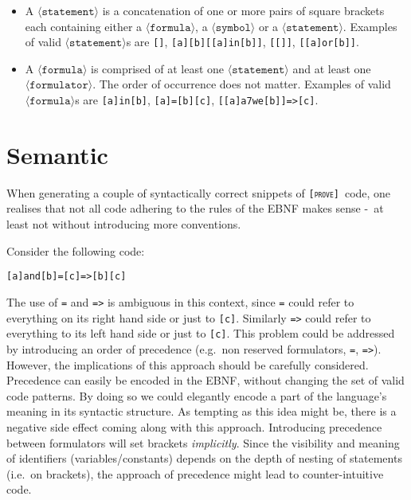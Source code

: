 \documentclass[british]{article}
\newcommand\prv{bc}
\newcommand\m[1]{\texttt{#1}}
\newcommand\name{\texttt{\textsc{[prove]}}}
\begin{document}
\begin{itemize}
		to choose them wisely. It could for example be confusing to name a
		formulator \m{7}, but \m{add7} makes intuitively sense.
	\item
		A $\langle\texttt{statement}\rangle$ is a concatenation of one or more
		pairs of square brackets each containing either a
		$\langle\texttt{formula}\rangle$, a $\langle\texttt{symbol}\rangle$ or a
		$\langle\texttt{statement}\rangle$.  Examples of valid
		$\langle\texttt{statement}\rangle$s are \m{[]}, \m{[a][b][[a]in[b]]},
		\m{[[]]}, \m{[[a]or[b]]}.  \item A $\langle\texttt{formula}\rangle$ is
		comprised of at least one $\langle\texttt{statement}\rangle$ and at
		least one $\langle\texttt{formulator}\rangle$. The order of occurrence
		does not matter. Examples of valid $\langle\texttt{formula}\rangle$s are
		\m{[a]in[b]}, \m{[a]=[b][c]}, \m{[[a]a7we[b]]=>[c]}.
\end{itemize}

\section{Semantic}

When generating a couple of syntactically correct snippets of \name\ code, one
realises that not all code adhering to the rules of the EBNF makes sense -\ at
least not without introducing more conventions.

\medskip{}

Consider the following code:

\begin{verbatim}
[a]and[b]=[c]=>[b][c]
\end{verbatim}

The use of \m{=} and \m{=>} is ambiguous in this context, since \m{=} could
refer to everything on its right hand side or just to \m{[c]}. Similarly \m{=>}
could refer to everything to its left hand side or just to \m{[c]}. This problem
could be addressed by introducing an order of precedence (e.g.\ non reserved
formulators, \m{=}, \m{=>}). However, the implications of this approach should
be carefully considered. Precedence can easily be encoded in the EBNF, without
changing the set of valid code patterns. By doing so we could elegantly encode a
part of the language's meaning in its syntactic structure. As tempting as this
idea might be, there is a negative side effect coming along with this approach.
Introducing precedence between formulators will set brackets \emph{implicitly}.
Since the visibility and meaning of identifiers (variables/constants) depends on
the depth of nesting of statements (i.e.\ on brackets), the approach of
precedence might lead to counter-intuitive code.\newline 
\end{document}
